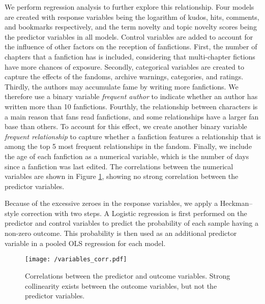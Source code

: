 \documentclass[letterpaper]{article} %
\begin{document}
We perform regression analysis to further explore this relationship. Four models are created with response variables being the logarithm of kudos, hits, comments, and bookmarks respectively, and the term novelty and topic novelty scores being the predictor variables in all models. Control variables are added to account for the influence of other factors on the reception of fanfictions. First, the number of chapters that a fanfiction has is included, considering that multi-chapter fictions have more chances of exposure. Secondly, categorical variables are created to capture the effects of the fandoms, archive warnings, categories, and ratings. Thirdly, the authors may accumulate fame by writing more fanfictions. We therefore use a binary variable \emph{frequent author} to indicate whether an author has written more than 10 fanfictions. Fourthly, the relationship between characters is a main reason that fans read fanfictions, and some relationships have a larger fan base than others. To account for this effect, we create another binary variable \emph{frequent relationship} to capture whether a fanfiction features a relationship that is among the top 5 most frequent relationships in the fandom. Finally, we include the age of each fanfiction as a numerical variable, which is the number of days since a fanfiction was last edited. The correlations between the numerical variables are shown in Figure \ref{fig:corr}, showing no strong correlation between the predictor variables.

Because of the excessive zeroes in the response variables, we apply a Heckman--style correction with two steps. A Logistic regression is first performed on the predictor and control variables to predict the probability of each sample having a non-zero outcome. This probability is then used as an additional predictor variable in a pooled OLS regression for each model.

\begin{figure}
    \centering
          \texttt{[image: /variables\_corr.pdf]}
        \caption{Correlations between the predictor and outcome variables. Strong collinearity exists between the outcome variables, but not the predictor variables. }
        \label{fig:corr}
\end{figure}
\end{document}
